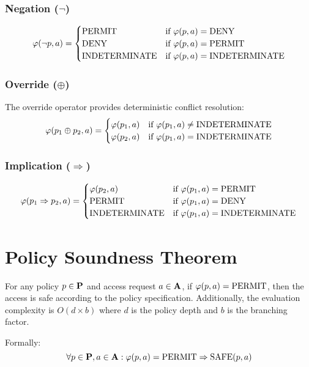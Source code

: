 \subsubsection{Negation ($\neg$)}
\begin{equation}
\varphi(\neg p, a) = \begin{cases}
\text{PERMIT} & \text{if } \varphi(p, a) = \text{DENY} \\
\text{DENY} & \text{if } \varphi(p, a) = \text{PERMIT} \\
\text{INDETERMINATE} & \text{if } \varphi(p, a) = \text{INDETERMINATE}
\end{cases}
\end{equation}

\subsubsection{Override ($\oplus$)}
The override operator provides deterministic conflict resolution:
\begin{equation}
\varphi(p_1 \oplus p_2, a) = \begin{cases}
\varphi(p_1, a) & \text{if } \varphi(p_1, a) \neq \text{INDETERMINATE} \\
\varphi(p_2, a) & \text{if } \varphi(p_1, a) = \text{INDETERMINATE}
\end{cases}
\end{equation}

\subsubsection{Implication ($\Rightarrow$)}
\begin{equation}
\varphi(p_1 \Rightarrow p_2, a) = \begin{cases}
\varphi(p_2, a) & \text{if } \varphi(p_1, a) = \text{PERMIT} \\
\text{PERMIT} & \text{if } \varphi(p_1, a) = \text{DENY} \\
\text{INDETERMINATE} & \text{if } \varphi(p_1, a) = \text{INDETERMINATE}
\end{cases}
\end{equation}

\newpage

\section{Policy Soundness Theorem}

\begin{theorem}
\label{thm:policy-soundness}
For any policy $p \in \mathbf{P}$ and access request $a \in \mathbf{A}$, if $\varphi(p, a) = \text{PERMIT}$, then the access is safe according to the policy specification. Additionally, the evaluation complexity is $O(d \times b)$ where $d$ is the policy depth and $b$ is the branching factor.

Formally:
\begin{equation}
\forall p \in \mathbf{P}, a \in \mathbf{A}: \varphi(p, a) = \text{PERMIT} \Rightarrow \text{SAFE}(p, a)
\end{equation}
\end{theorem}

